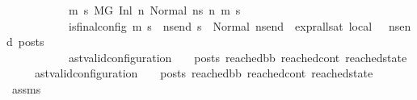 \begin{isabellebody}
\ \ \ \ \ \ \ \ \ \ \ {\isacharparenleft}{\kern0pt}{\isasymAnd}m{\isacharprime}{\kern0pt}\ s{\isacharprime}{\kern0pt}{\isachardot}{\kern0pt}\ {\isacharparenleft}{\kern0pt}M{\isacharcomma}{\kern0pt}{\isasymLambda}{\isacharcomma}{\kern0pt}{\isasymGamma}{\isacharcomma}{\kern0pt}{\isasymOmega}{\isacharcomma}{\kern0pt}G\ {\isasymturnstile}{\isacharparenleft}{\kern0pt}Inl\ n{\isacharcomma}{\kern0pt}\ Normal\ ns{}{\isacharprime}{\kern0pt}{\isacharprime}{\kern0pt}{\isacharparenright}{\kern0pt}\ {\isacharminus}{\kern0pt}n{\isasymrightarrow}{\isacharasterisk}{\kern0pt}\ {\isacharparenleft}{\kern0pt}m{\isacharprime}{\kern0pt}{\isacharcomma}{\kern0pt}\ s{\isacharprime}{\kern0pt}{\isacharparenright}{\kern0pt}{\isacharparenright}{\kern0pt}\ {\isasymLongrightarrow}\isanewline
\ \ \ \ \ \ \ \ \ \ \ is{\isacharunderscore}{\kern0pt}final{\isacharunderscore}{\kern0pt}config\ {\isacharparenleft}{\kern0pt}m{\isacharprime}{\kern0pt}{\isacharcomma}{\kern0pt}\ s{\isacharprime}{\kern0pt}{\isacharparenright}{\kern0pt}\ {\isasymLongrightarrow}\ {\isasymforall}ns{\isacharunderscore}{\kern0pt}end{\isachardot}{\kern0pt}\ s{\isacharprime}{\kern0pt}\ {\isacharequal}{\kern0pt}\ Normal\ ns{\isacharunderscore}{\kern0pt}end\ {\isasymlongrightarrow}\ {\isacharparenleft}{\kern0pt}expr{\isacharunderscore}{\kern0pt}all{\isacharunderscore}{\kern0pt}sat\ {\isasymLambda}{}{\isacharunderscore}{\kern0pt}local\ {\isasymGamma}\ {\isasymOmega}\ ns{\isacharunderscore}{\kern0pt}end{\isacharparenright}{\kern0pt}\ posts{\isacharparenright}{\kern0pt}\ {\isasymLongrightarrow}\isanewline
\ \ \ \ \ \ \ \ \ \ \ {\isacharparenleft}{\kern0pt}ast{\isacharunderscore}{\kern0pt}valid{\isacharunderscore}{\kern0pt}configuration\ {\isasymLambda}\ {\isasymGamma}\ {\isasymOmega}\ posts\ reached{\isacharunderscore}{\kern0pt}bb\ reached{\isacharunderscore}{\kern0pt}cont\ reached{\isacharunderscore}{\kern0pt}state{\isacharparenright}{\kern0pt}{\isachardoublequoteclose}\isanewline
\ \ \ \ \ {\isachardoublequoteopen}ast{\isacharunderscore}{\kern0pt}valid{\isacharunderscore}{\kern0pt}configuration\ {\isasymLambda}\ {\isasymGamma}\ {\isasymOmega}\ posts\ reached{\isacharunderscore}{\kern0pt}bb\ reached{\isacharunderscore}{\kern0pt}cont\ reached{\isacharunderscore}{\kern0pt}state{\isachardoublequoteclose}\isanewline
%
\isadelimproof
%
\endisadelimproof
%
\isatagproof
{}\isamarkupfalse%
\ {\isacharminus}{\kern0pt}\isanewline
\ \ \isamarkupfalse%
\ assms{\isacharparenleft}{\kern0pt}{}{\isacharminus}{\kern0pt}{}{\isacharparenright}{\kern0pt}\ \isamarkupfalse%

\end{isabellebody}
